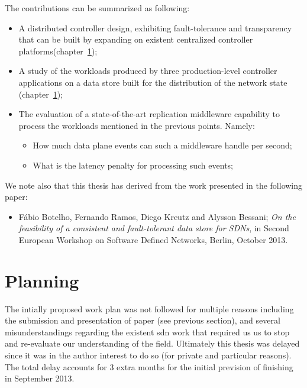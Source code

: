 
The contributions can be summarized as following: 
\begin{itemize}
\item A distributed controller design, exhibiting fault-tolerance and transparency that can be built by expanding on existent centralized controller platforms(chapter~\ref{});
\item A study of the workloads produced by three production-level controller applications on a data store built for the distribution of the network state (chapter~\ref{}); 
\item The evaluation of  a state-of-the-art replication middleware capability to process the workloads mentioned in the previous points. Namely: 
  \begin{itemize}
  \item How much data plane events can such a middleware handle per second; 
  \item What is the latency penalty for processing such events; 
  \end{itemize}
\end{itemize}

We note also that this thesis has derived from the work presented in the following paper: 

\begin{itemize}
\item Fábio Botelho, Fernando Ramos, Diego Kreutz and Alysson Bessani; \emph{On the feasibility of a consistent and fault-tolerant data store for SDNs}, in Second European Workshop on Software Defined Networks, Berlin, October 2013. 
\end{itemize}

\section{Planning}
The intially proposed work plan was not followed for multiple reasons including the submission and presentation of paper (see previous section), and several misunderstandings regarding the existent \gls{sdn} work that required us us to stop and re-evaluate our understanding of the field. Ultimately this thesis was delayed since it was in the author interest to do so (for private and particular reasons). The total delay accounts  for 3 extra months for the initial prevision of finishing in September  2013. 


